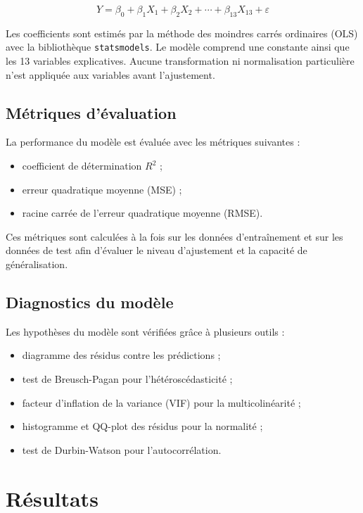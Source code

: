 \documentclass[a4paper,12pt]{article}
\begin{document}
\[
Y = \beta_0 + \beta_1 X_1 + \beta_2 X_2 + \cdots + \beta_{13} X_{13} + \varepsilon
\]

Les coefficients sont estimés par la méthode des moindres carrés ordinaires (OLS) avec la bibliothèque \texttt{statsmodels}. Le modèle comprend une constante ainsi que les 13 variables explicatives. Aucune transformation ni normalisation particulière n’est appliquée aux variables avant l’ajustement.

\subsection{Métriques d’évaluation}
La performance du modèle est évaluée avec les métriques suivantes :

\begin{itemize}[leftmargin=1.5em]
    \item coefficient de détermination $R^2$ ;
    \item erreur quadratique moyenne (MSE) ;
    \item racine carrée de l’erreur quadratique moyenne (RMSE).
\end{itemize}

Ces métriques sont calculées à la fois sur les données d’entraînement et sur les données de test afin d’évaluer le niveau d’ajustement et la capacité de généralisation.

\subsection{Diagnostics du modèle}
Les hypothèses du modèle sont vérifiées grâce à plusieurs outils :

\begin{itemize}[leftmargin=1.5em]
    \item diagramme des résidus contre les prédictions ;
    \item test de Breusch-Pagan pour l’hétéroscédasticité ;
    \item facteur d’inflation de la variance (VIF) pour la multicolinéarité ;
    \item histogramme et QQ-plot des résidus pour la normalité ;
    \item test de Durbin-Watson pour l’autocorrélation.
\end{itemize}

\section{Résultats}
\end{document}
